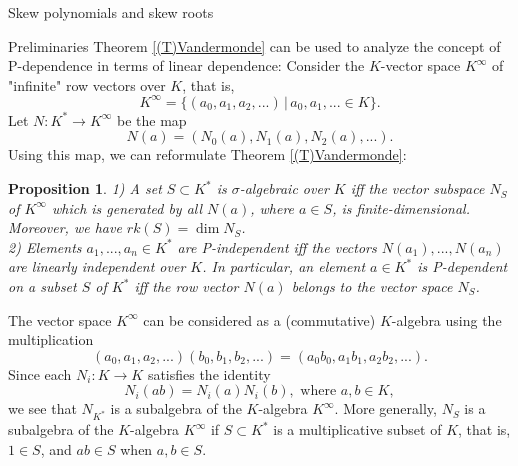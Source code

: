 \documentclass[11pt,a4paper]{article}
\theoremstyle{theorem}
\newtheorem{proposition}[theorem]{Proposition}
\numberwithin{equation}{section}
\newcommand{\s}{\sigma}
\begin{document}
\begin{section}{Skew polynomials and skew roots}
\begin{subsection}{Preliminaries}
	Theorem \ref{(T)Vandermonde} can be used  to analyze the concept of P-dependence in terms of linear dependence:  Consider the $K$-vector space $K^\infty$ of "infinite" row vectors over $K$, that is,
	$$K^\infty=\{(a_0,a_1,a_2,...)\,|\, a_0,a_1,...\in K\}.$$
	Let $N:K^*\to K^\infty$ be the map
	$$N(a)=(N_0(a),N_1(a),N_2(a),...).$$
	Using this map, we can reformulate Theorem \ref{(T)Vandermonde}:
	\begin{proposition} \label{(P)reformulationofVandermonde}
		1) A set $S\subset  K^*$ is $\s$-algebraic over $K$ iff the vector subspace 
		$N_S$ of $K^\infty$ which is generated by all $N(a)$, where $a\in S$, is finite-dimensional. Moreover, we have
		$rk(S)=\dim N_S$. \\
		2) Elements $a_1,...,a_n\in K^*$ are P-independent iff the vectors $N(a_1),...,N(a_n)$ are linearly independent over $K$. In particular, an element $a\in K^*$ is P-dependent on a subset $S$ of $K^*$ iff the row vector $N(a)$ belongs to the vector space $N_S$. 
	\end{proposition}
	The vector space $K^\infty$ can be considered as a (commutative) $K$-algebra using the multiplication
	$$(a_0,a_1,a_2,...)(b_0,b_1,b_2,...)=(a_0b_0,a_1b_1,a_2b_2,...).$$
	Since each $N_i:K\to K$ satisfies the identity $$N_i(ab)=N_i(a)N_i(b), \text{ where } a,b\in K,$$ we see that $N_{K^*}$ is a subalgebra of the $K$-algebra $K^\infty$.  More generally, $N_{S}$ is a subalgebra of the $K$-algebra $K^\infty$ if $S\subset K^*$ is a multiplicative subset of $K$, that is, $1\in S$, and $ab\in S$ when $a,b\in S$.  
	

\end{subsection}
\end{section}
\end{document}
